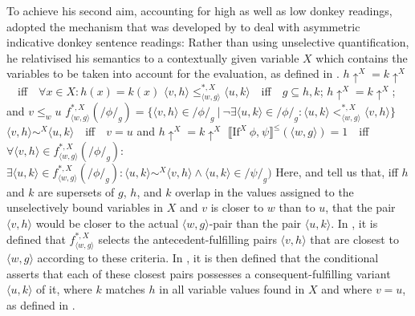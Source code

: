 To achieve his second aim, accounting for high as well as low donkey readings, \textcite{vanRooij2006} adopted the mechanism that was developed by \textcite{Root1986} to deal with asymmetric indicative donkey sentence readings: Rather than using unselective quantification, he relativised his semantics to a contextually given variable $X$ which contains the variables to be taken into account for the evaluation, as defined in .
\pex[nopreamble=true]\label{def:rooij-relative}%
\a{} $h\uparrow^X=k\uparrow^X$~~iff~~$\forall{x\in X}:h(x)=k(x)$
\a{} $\langle v,h\rangle\leqslant^{*,X}_{\langle w,g\rangle}\langle u,k\rangle$~~iff~~$g\subseteq h,k$; $h\uparrow^{X}=k\uparrow^{X}$; and $v\leqslant_w u$
\a{} $f^{*,X}_{\langle w,g\rangle}(/\phi/_g)=\{\langle v,h\rangle\in/\phi/_g~|~\neg\exists\langle u,k\rangle\in/\phi/_g:\langle u,k\rangle<^{*,X}_{\langle w,g\rangle}\langle v,h\rangle\}$
\a{} $\langle v,h\rangle\sim^X\langle u,k\rangle$~~iff~~$v=u$ and $h\uparrow^X=k\uparrow^X$
\a{} $\llbracket\text{If}^{X}~\phi\text{,}~\psi\rrbracket^\leqslant(\langle w,g\rangle)=1$~~iff~~$\forall{\langle v,h\rangle\in f^{*,X}_{\langle w,g\rangle}(/\phi/_g)}:$\\\emptyfill$\exists\langle u,k\rangle\in f^{*,X}_{\langle w,g\rangle}(/\phi/_g):\langle u,k\rangle\sim^X\langle v,h\rangle\land\langle u,k\rangle\in/\psi/_g)$
\xe
Here,  and  tell us that, iff $h$ and $k$ are supersets of $g$, $h$, and $k$ overlap in the values assigned to the unselectively bound variables in $X$ and $v$ is closer to $w$ than to $u$, that the pair $\langle v,h\rangle$ would be closer to the actual $\langle w,g\rangle$-pair than the pair $\langle u,k\rangle$. In , it is defined that $f^{*,X}_{\langle w,g\rangle}$ selects the antecedent-fulfilling pairs $\langle v,h\rangle$ that are closest to $\langle w,g\rangle$ according to these criteria. In , it is then defined that the conditional asserts that each of these closest pairs possesses a consequent-fulfilling variant $\langle u,k\rangle$ of it, where $k$ matches $h$ in all variable values found in $X$ and where $v=u$, as defined in .


